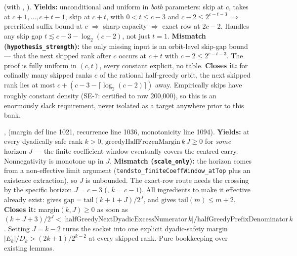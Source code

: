 \begin{obs} 
(with ,
).
\textbf{Yields:} unconditional and uniform in \emph{both} parameters: skip at $c$, takes at
$c{+}1,\dots,c{+}t{-}1$, skip at $c{+}t$, with $0<t\le c-3$ and $c-2\le 2^{c-t-3}$
$\Rightarrow$ precritical suffix bound at $c$ $\Rightarrow$ sharp capacity $\Rightarrow$ exact
row at $2c{-}2$. Handles any skip gap $t \lesssim c-3-\log_2(c-2)$, not just $t=1$.
\textbf{Mismatch (\texttt{hypothesis\_strength}):} the only missing input is an orbit-level
skip-gap bound — that the next skipped rank after $c$ occurs at $c{+}t$ with $c-2 \le
2^{c-t-3}$. The proof is fully uniform in $(c,t)$, every constant explicit, no table.
\textbf{Closes it:} for cofinally many skipped ranks $c$ of the rational half-greedy orbit, the
next skipped rank lies at most $c + (c-3-\lceil\log_2(c-2)\rceil)$ away. Empirically skips have
roughly constant density (SE-7: certified to row 200{,}000), so this is an enormously slack
requirement, never isolated as a target anywhere prior to this bank.
\end{obs}

\begin{obs} 
,
(margin def line 1021, recurrence line 1036, monotonicity line 1094).
\textbf{Yields:} at every dyadically safe rank $k>0$, $\mathrm{greedyHalfFrozenMargin}\,k\,J \ge
0$ for \emph{some} horizon $J$ — the finite coefficient window eventually covers the centred
carry. Nonnegativity is monotone up in $J$.
\textbf{Mismatch (\texttt{scale\_only}):} the horizon comes from a non-effective limit argument
(\texttt{tendsto\_finiteCoeffWindow\_atTop} plus an existence extraction), so $J$ is unbounded.
The exact-row route needs the crossing by the specific horizon $J=c-3$
(,
$k=c-1$). All ingredients to make it effective already exist:
 gives
$\mathrm{gap}=\mathrm{tail}(k{+}1{+}J)/2^J$, and
 gives $\mathrm{tail}(m)\le m+2$.
\textbf{Closes it:} margin$(k,J)\ge0$ as soon as $(k{+}J{+}3)/2^J <
|\mathrm{halfGreedyNextDyadicExcessNumerator}\,k|/\mathrm{halfGreedyPrefixDenominator}\,k$.
Setting $J=k-2$ turns the socket into one explicit dyadic-safety margin
$|E_k|/D_k > (2k{+}1)/2^{k-2}$ at every skipped rank. Pure bookkeeping over existing lemmas.
\end{obs}

